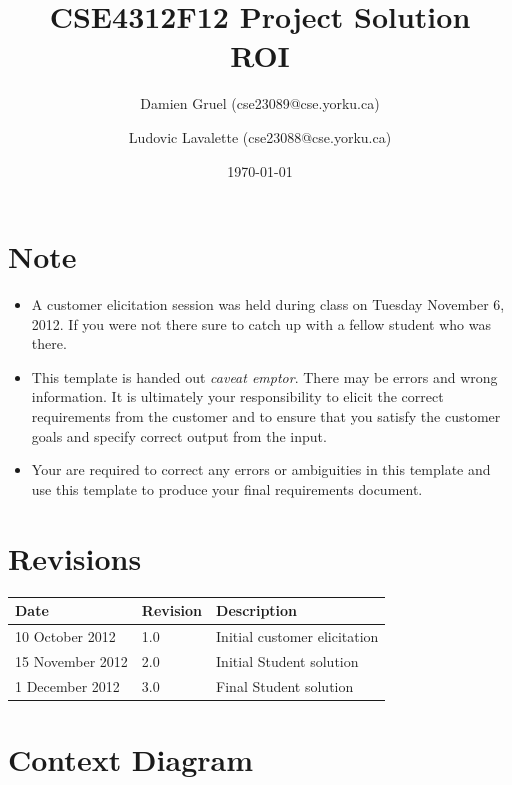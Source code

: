 \documentclass[runningheads,12pt]{article}
\begin{document}
\title{CSE4312F12 Project Solution\\
ROI}

\author{Damien Gruel (cse23089@cse.yorku.ca)
\and Ludovic Lavalette (cse23088@cse.yorku.ca)}

\date{\today}

\maketitle


\section*{Note}
\begin{itemize}
\item A customer elicitation session was held during class on Tuesday November 6, 2012. If you were not there sure to catch up with a fellow student who was there.
\item This template is handed out \emph{caveat emptor}.  There may be errors and wrong information. It is ultimately your responsibility to elicit the correct requirements from the customer and to ensure that you satisfy the customer goals and specify correct output from the input.
\item Your are required to correct any errors or ambiguities in this template and use this template to produce your final requirements document.
\end{itemize}

\section*{Revisions}

\begin{tabular}{|l|l|p{3in}|}
\hline
Date & Revision& Description \\ 
\hline
10 October  2012 
& 1.0       
& Initial customer elicitation\\ 
\hline
15 November 2012
& 2.0       
& Initial Student solution       \\
\hline
1 December 2012
& 3.0       
& Final Student solution       \\
\hline
\end{tabular}

\newpage
\tableofcontents
\listoffigures
\listoftables

\newpage

\section{Context Diagram}
\end{document}
